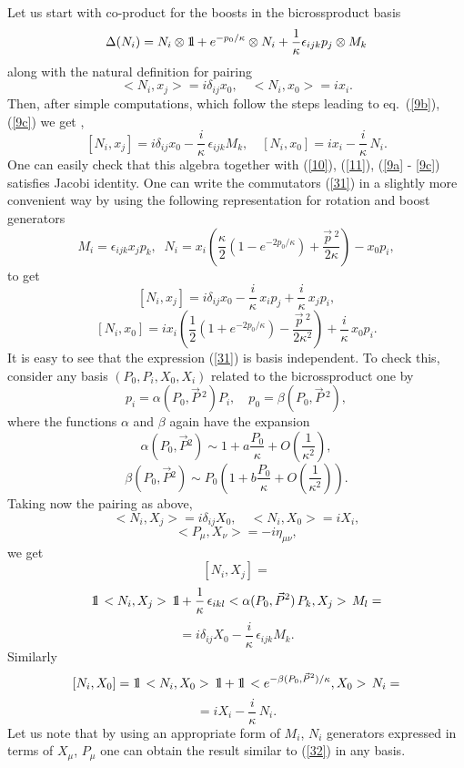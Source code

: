 \documentclass [prd,twocolumn,nofootinbib,showpacs]  {revtex4}
\def\bbbone{{\mathchoice {\rm 1\mskip-4mu l} {\rm 1\mskip-4mu l}
{\rm 1\mskip-4.5mu l} {\rm 1\mskip-5mu l}}}
\begin{document}
Let us start with co-product for the boosts in the bicrossproduct basis
\begin{equation}\label{29}
 \Delta(N_{i}) = N_{i}\otimes \bbbone  +
e^{-{p_{0}/ \kappa}}\otimes N_{i} + {1\over \kappa}
\epsilon_{ijk}p_{j}\otimes M_{k}
\end{equation}
along with the natural definition for pairing
\begin{equation}\label{30}
<N_i, x_j> = i \delta_{ij} x_0, \quad <N_i, x_0> = i  x_i.
\end{equation}
Then, after simple computations, which follow the steps leading to
eq.~(\ref{9b}), (\ref{9c})  we get \cite{luno}, \cite{lukps}
\begin{equation}\label{31}
[N_i, x_j] = i \delta_{ij} x_0 - \frac{i}\kappa\, \epsilon_{ijk} M_k, \quad [N_i, x_0] = i x_{i} - \frac{i}\kappa\, N_i.
\end{equation}
One can easily check that this algebra together with (\ref{10}),
(\ref{11}), (\ref{9a} - \ref{9c})  satisfies Jacobi identity. One
can write the commutators (\ref{31}) in a slightly more convenient
way by using the following representation for rotation and boost
generators
$$
M_i = \epsilon_{ijk}x_jp_k, \;\; N_i =x_i \left(\frac\kappa2 \left(1-e^{-2p_0/\kappa}\right) +
\frac{\vec{p}\,{}^2}{2\kappa}\right) - x_0 p_i,
$$
to get
$$
[N_i, x_j] = i \delta_{ij} x_0 - \frac{i}\kappa\, x_i p_j + \frac{i}\kappa\, x_j p_i,
$$
\begin{equation}\label{32}
 [N_i, x_0] =  i x_i \left(\frac12 \left(1+e^{-2p_0/\kappa}\right) -\frac{\vec{p}\,{}^2}{2\kappa^2}\right)
 + \frac{i}\kappa\,x_0 p_i.
\end{equation}
It is easy to see that the expression (\ref{31}) is basis
independent. To check this, consider any  basis $(P_0, P_i, X_0,
X_i)$ related to the bicrossproduct one by
$$
p_i = \alpha(P_0, \vec{P}\,{}^2) P_i, \quad p_0 = \beta(P_0, \vec{P}\,{}^2),
$$
where the functions $\alpha$ and $\beta$ again have the expansion
$$
 \alpha({ P}_0, \vec{{    P}}{}^2) \sim 1 + a \frac{{ P}_0}{\kappa} + O\left(\frac{1}{\kappa^2}\right),
$$
\begin{equation}\label{33}
\beta({ P}_0, \vec{{    P}}{}^2) \sim { P}_0\left(1 + b \frac{{ P}_0}{\kappa} +
O\left(\frac{1}{\kappa^2}\right)\right).
\end{equation}
Taking now the pairing as above,
$$
<N_i, X_j> = i \delta_{ij} X_0, \quad <N_i, X_0> = i  X_i, $$ $$ <P_\mu, X_\nu> = -i \eta_{\mu\nu},
$$
we get
$$
[N_i, X_j] =$$ $$ \bbbone\, < N_i, X_j >\, \bbbone +
\frac1\kappa\, \epsilon_{ikl} <\alpha({ P}_0, \vec{{    P}}{}^2)\, P_k, X_j >\, M_l =
$$
\begin{equation}\label{34}
 = i \delta_{ij} X_0 - \frac{i}\kappa\, \epsilon_{ijk} M_k.
\end{equation}
Similarly
$$
[N_i, X_0] = \bbbone\, < N_i, X_0 >\, \bbbone +
\bbbone\, <e^{-\beta({ P}_0, \vec{{    P}}{}^2)/\kappa}, X_0 >\, N_i =
$$
\begin{equation}\label{35}
 = i  X_i - \frac{i}\kappa\,  N_i.
\end{equation}
Let us note that by using an appropriate form of $M_i$, $N_i$
generators expressed in terms of $X_\mu$,  $P_\mu$ one can obtain
the result similar to (\ref{32}) in any basis.
\end{document}
